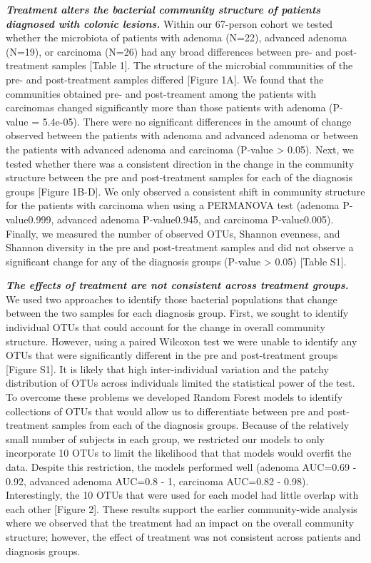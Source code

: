 \documentclass[12pt,]{article}
\begin{document}
\textbf{\emph{Treatment alters the bacterial community structure of
patients diagnosed with colonic lesions.}} Within our 67-person cohort
we tested whether the microbiota of patients with adenoma (N=22),
advanced adenoma (N=19), or carcinoma (N=26) had any broad differences
between pre- and post-treatment samples {[}Table 1{]}. The structure of
the microbial communities of the pre- and post-treatment samples
differed {[}Figure 1A{]}. We found that the communities obtained pre-
and post-treament among the patients with carcinomas changed
significantly more than those patients with adenoma (P-value = 5.4e-05).
There were no significant differences in the amount of change observed
between the patients with adenoma and advanced adenoma or between the
patients with advanced adenoma and carcinoma (P-value \textgreater{}
0.05). Next, we tested whether there was a consistent direction in the
change in the community structure between the pre and post-treatment
samples for each of the diagnosis groups {[}Figure 1B-D{]}. We only
observed a consistent shift in community structure for the patients with
carcinoma when using a PERMANOVA test (adenoma P-value0.999, advanced
adenoma P-value0.945, and carcinoma P-value0.005). Finally, we measured
the number of observed OTUs, Shannon evenness, and Shannon diversity in
the pre and post-treatment samples and did not observe a significant
change for any of the diagnosis groups (P-value \textgreater{} 0.05)
{[}Table S1{]}.

\textbf{\emph{The effects of treatment are not consistent across
treatment groups.}} We used two approaches to identify those bacterial
populations that change between the two samples for each diagnosis
group. First, we sought to identify individual OTUs that could account
for the change in overall community structure. However, using a paired
Wilcoxon test we were unable to identify any OTUs that were
significantly different in the pre and post-treatment groups {[}Figure
S1{]}. It is likely that high inter-individual variation and the patchy
distribution of OTUs across individuals limited the statistical power of
the test. To overcome these problems we developed Random Forest models
to identify collections of OTUs that would allow us to differentiate
between pre and post-treatment samples from each of the diagnosis
groups. Because of the relatively small number of subjects in each
group, we restricted our models to only incorporate 10 OTUs to limit the
likelihood that that models would overfit the data. Despite this
restriction, the models performed well (adenoma AUC=0.69 - 0.92,
advanced adenoma AUC=0.8 - 1, carcinoma AUC=0.82 - 0.98). Interestingly,
the 10 OTUs that were used for each model had little overlap with each
other {[}Figure 2{]}. These results support the earlier community-wide
analysis where we observed that the treatment had an impact on the
overall community structure; however, the effect of treatment was not
consistent across patients and diagnosis groups.
\end{document}
